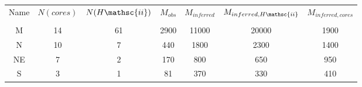 \begin{table*}[htp]
\begin{tabular}{ccccccc}
\label{tab:clustermassestimates}
Name & $N(cores)$ & $N(H\mathsc{ii})$ & $M_{obs}$ & $M_{inferred}$ & $M_{inferred, H\mathsc{ii}}$ & $M_{inferred, cores}$ \\
 &  &  &  &  &  &  \\
\hline
M & 14 & 61 & 2900 & 11000 & 20000 & 1900 \\
N & 10 & 7 & 440 & 1800 & 2300 & 1400 \\
NE & 7 & 2 & 170 & 800 & 650 & 950 \\
S & 3 & 1 & 81 & 370 & 330 & 410 \\
\hline
\end{tabular}
\end{table*}
